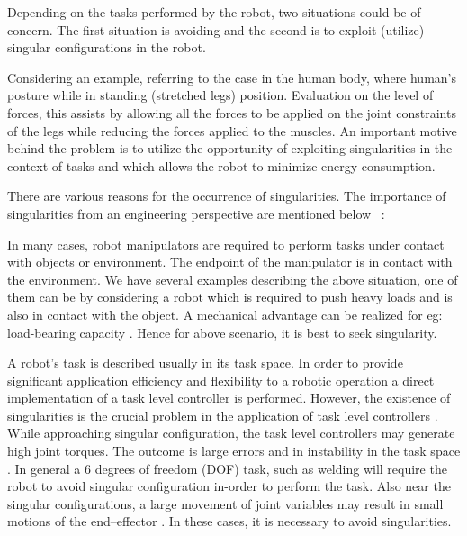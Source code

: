 Depending on the tasks performed by the robot, two situations could be of concern. The first situation is avoiding and the second is to exploit (utilize) singular configurations in the robot. 


Considering an example, referring to the case in the human body, where human's posture while in standing (stretched legs) position. Evaluation on the level of forces, this assists by allowing all the forces to be applied on the joint constraints of the legs while reducing the forces applied to the muscles. An important motive behind the problem is to utilize the opportunity of exploiting singularities in the context of tasks and which allows the robot to minimize energy consumption. 


There are various reasons for the occurrence of singularities. The importance of singularities from an engineering perspective are mentioned below  ~\cite{abdolmalaki2017geometric}:


In many cases, robot manipulators are required to perform tasks under contact with objects or environment. The endpoint of the manipulator is in contact with the environment. We have several examples describing the above situation, one of them can be by considering a robot which is required to push heavy loads and is also in contact with the object. A mechanical advantage can be realized for eg: load-bearing capacity \cite{abdolmalaki2017geometric}. Hence for above scenario, it is best to seek singularity. 


A robot's task is described usually in its task space. In order to provide significant application efficiency and flexibility to a robotic operation a direct implementation of a task level controller is performed. However, the existence of singularities is the crucial problem in the application of task level controllers \cite{Clara2012}. While approaching singular configuration, the task level controllers may generate high joint torques. The outcome is large errors and in instability in the task space \cite{tan2004singularity}. In general a 6 degrees of freedom (DOF) task, such as welding will require the robot to avoid singular configuration in-order to perform the task. Also near the singular configurations, a large movement of joint variables may result in small motions of the end–effector \cite{donelan2007singularities}. In these cases, it is necessary to avoid singularities.


